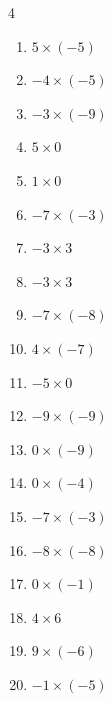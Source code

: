 \begin{multicols}{4}
\begin{enumerate}
  \item $5\times (-5)$
        \phantom{$=-25$}

  \item $-4\times (-5)$
        \phantom{$=20$}

  \item $-3\times (-9)$
        \phantom{$=27$}

  \item $5\times 0$
        \phantom{$=0$}

  \item $1\times 0$
        \phantom{$=0$}

  \item $-7\times (-3)$
        \phantom{$=21$}

  \item $-3\times 3$
        \phantom{$=-9$}

  \item $-3\times 3$
        \phantom{$=-9$}

  \item $-7\times (-8)$
        \phantom{$=56$}

  \item $4\times (-7)$
        \phantom{$=-28$}

  \item $-5\times 0$
        \phantom{$=0$}

  \item $-9\times (-9)$
        \phantom{$=81$}

  \item $0\times (-9)$
        \phantom{$=0$}

  \item $0\times (-4)$
        \phantom{$=0$}

  \item $-7\times (-3)$
        \phantom{$=21$}

  \item $-8\times (-8)$
        \phantom{$=64$}

  \item $0\times (-1)$
        \phantom{$=0$}

  \item $4\times 6$
        \phantom{$=24$}

\columnbreak %

  \item $9\times (-6)$
        \phantom{$=-54$}

  \item $-1\times (-5)$
        \phantom{$=5$}


\end{enumerate}
\end{multicols}
